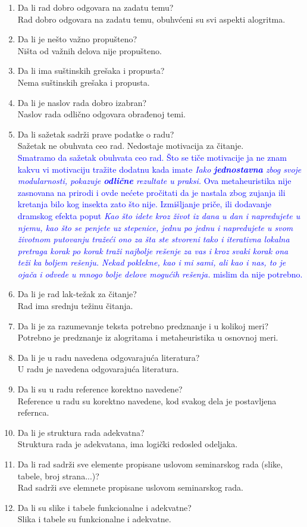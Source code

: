 \documentclass[a4paper]{report}
\newcommand{\odgovor}[1]{\textcolor{blue}{#1}}
\begin{document}
\begin{enumerate}
\item Da li rad dobro odgovara na zadatu temu?\\
Rad dobro odgovara na zadatu temu, obuhvćeni su svi aspekti alogritma.
\item Da li je nešto važno propušteno?\\
Ništa od važnih delova nije propušteno.
\item Da li ima suštinskih grešaka i propusta?\\
Nema suštinskih grešaka i propusta.
\item Da li je naslov rada dobro izabran?\\
Naslov rada odlično odgovara obrađenoj temi.
\item Da li sažetak sadrži prave podatke o radu?\\
Sažetak ne obuhvata ceo rad. Nedostaje motivacija za čitanje.\\
\odgovor{Smatramo da sažetak obuhvata ceo rad. Što se tiče motivacije ja ne znam kakvu vi motivaciju tražite dodatnu kada imate \textit{Iako \textbf{jednostavna} zbog svoje modularnosti, pokazuje \textbf{odlične} rezultate u praksi.} Ova metaheuristika nije zasnovana na prirodi i ovde nećete pročitati 
da je nastala zbog zujanja ili kretanja bilo kog insekta zato što nije. Izmišljanje priče, ili dodavanje dramskog efekta poput \textit{Kao što idete kroz život iz dana u dan i napredujete u njemu, kao što se penjete uz stepenice, jednu po jednu i napredujete u svom životnom putovanju tražeći ono za šta ste stvoreni tako i iterativna lokalna pretraga korak po korak traži najbolje rešenje za vas i kroz 
svaki korak ona teži ka boljem rešenju. Nekad poklekne, kao i mi sami, ali kao i nas, to je ojača i odvede u mnogo bolje delove mogućih rešenja.} mislim da nije potrebno.\\}
\item Da li je rad lak-težak za čitanje?\\
Rad ima srednju težinu čitanja.
\item Da li je za razumevanje teksta potrebno predznanje i u kolikoj meri?\\
Potrebno je predznanje iz alogritama i metaheuristika u osnovnoj meri.
\item Da li je u radu navedena odgovarajuća literatura?\\
U radu je navedena odgovarajuća literatura.
\item Da li su u radu reference korektno navedene?\\
Reference u radu su korektno navedene, kod svakog dela je postavljena refernca.
\item Da li je struktura rada adekvatna?\\
Struktura rada je adekvatana, ima logički redosled odeljaka.
\item Da li rad sadrži sve elemente propisane uslovom seminarskog rada (slike, tabele, broj strana...)?\\
Rad sadrži sve elemnete propisane uslovom seminarskog rada.
\item Da li su slike i tabele funkcionalne i adekvatne?\\
Slika i tabele su funkcionalne i adekvatne.
\end{enumerate}
\end{document}
